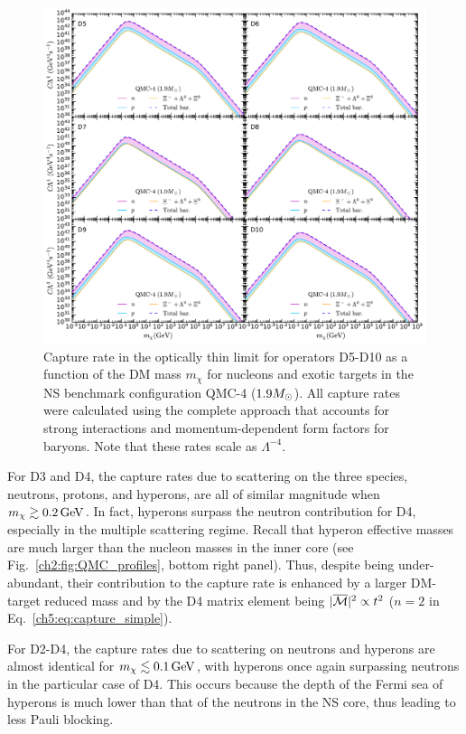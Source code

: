 \begin{figure}[t!bp] 
\centering
\includegraphics[width=\textwidth]{capture_3/D5_D10_C_mDM_hyper_meff.pdf}
\caption{Capture rate in the optically thin limit for operators D5-D10 as a function of the DM mass $m_\chi$ for nucleons and exotic targets in the NS benchmark configuration QMC-4 ($1.9M_\odot$). All capture rates were calculated using the complete approach that accounts for strong interactions and momentum-dependent form factors for baryons. Note that these rates scale as $\Lambda^{-4}$. 
}
\label{ch5:fig:capratesD5D10_Hyper}
\end{figure}  

For D3 and D4, the capture rates due to scattering on the three species, neutrons, protons, and hyperons, are all of similar magnitude when $m_\chi\gtrsim0.2{\rm \,GeV}$. In fact, hyperons surpass the neutron contribution for D4, especially in the multiple scattering regime.  Recall that hyperon effective masses are much larger than the nucleon masses in the inner core (see Fig.~\ref{ch2:fig:QMC_profiles}, bottom right panel). Thus, despite being under-abundant, their contribution to the capture rate is enhanced by a larger DM-target reduced mass and by the D4 matrix element being $|\overline{\mathcal M}|^2\propto t^2$ ($n=2$ in  Eq.~\ref{ch5:eq:capture_simple}). 

For D2-D4, the capture rates due to scattering on neutrons and hyperons are almost identical for $m_\chi\lesssim0.1{\rm \,GeV}$, with hyperons once again surpassing neutrons in the particular case of D4.  This occurs because the depth of the Fermi sea of hyperons is much lower than that of the neutrons in the NS core, thus leading to less Pauli blocking. 

